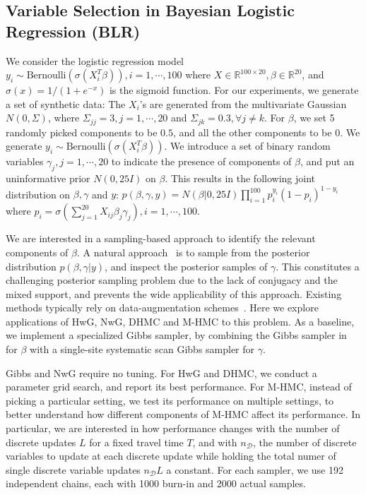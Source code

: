 \documentclass{article}
\newcommand{\cald}{\mathcal{D}}
\begin{document}
\subsection{Variable Selection in Bayesian Logistic Regression (BLR)}\label{sec:blr}
\vspace*{-6pt}
We consider the logistic regression model $ y_i \sim \text{Bernoulli}\left(\sigma(X_i^T\beta)\right), i=1,\cdots, 100 $
where $X\in\mathbb{R}^{100\times 20}, \beta\in\mathbb{R}^{20}$, and $\sigma(x)=1/(1+e^{-x})$ is the sigmoid function. For our experiments, we generate a set of synthetic data: The $X_i$'s are generated from the multivariate Gaussian $N(0, \Sigma)$, where $\Sigma_{j j} = 3, j=1, \cdots, 20$ and $\Sigma_{j k} = 0.3, \forall j\neq k$. For $\beta$, we set 5 randomly picked components to be $0.5$, and all the other components to be 0. We generate $y_i \sim \text{Bernoulli}\left(\sigma(X_i^T\beta)\right)$. We introduce a set of binary random variables $\gamma_j, j=1, \cdots, 20$ to indicate the presence of components of $\beta$, and put an uninformative prior $N(0, 25I)$ on $\beta$. This results in the following joint distribution on $\beta, \gamma$ and $y$: $p(\beta, \gamma, y) = N(\beta |0, 25I)\prod_{i=1}^{100}p_i^{y_i}(1 - p_i)^{1 - y_i}$ where $p_i=\sigma(\sum_{j=1}^{20}X_{i j}\beta_j\gamma_j), i=1, \cdots, 100$.

\vspace*{-2pt}

We are interested in a sampling-based approach to identify the relevant components of $\beta$. A natural approach~\cite{Dellaportas2000-pa, Zucknick2014-pf} is to sample from the posterior distribution $p(\beta, \gamma|y)$, and inspect the posterior samples of $\gamma$. This constitutes a challenging posterior sampling problem due to the lack of conjugacy and the mixed support, and prevents the wide applicability of this approach. Existing methods typically rely on data-augmentation schemes~\cite{Albert1993-ho, Carlin1995-fz, Holmes2006-xe, Polson2013-zt}. Here we explore applications of HwG, NwG, DHMC and M-HMC to this problem. As a baseline, we implement a specialized Gibbs sampler, by combining the Gibbs sampler in~\cite{Polson2013-zt} for $\beta$ with a single-site systematic scan Gibbs sampler for $\gamma$. 

\vspace*{-2pt}

Gibbs and NwG require no tuning. For HwG and DHMC, we conduct a parameter grid search, and report its best performance. For M-HMC, instead of picking a particular setting, we test its performance on multiple settings, to better understand how different components of M-HMC affect its performance. In particular, we are interested in how performance changes with the number of discrete updates $L$ for a fixed travel time $T$, and with $n_\cald$, the number of discrete variables to update at each discrete update while holding the total numer of single discrete variable updates $n_\cald L$ a constant. For each sampler, we use 192 independent chains, each with 1000 burn-in and 2000 actual samples. 
\end{document}
